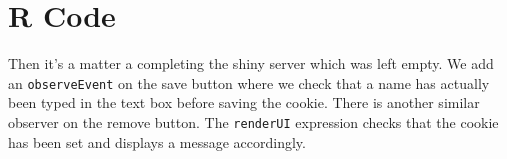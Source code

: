 \documentclass[
]{krantz}
\makeatletter
\newenvironment{Shaded}{\begin{snugshade}}{\end{snugshade}}
\newcommand{\AttributeTok}[1]{\textcolor[rgb]{0.61,0.61,0.61}{#1}}
\newcommand{\CommentTok}[1]{\textcolor[rgb]{0.37,0.37,0.37}{\textit{#1}}}
\newcommand{\KeywordTok}[1]{\textcolor[rgb]{0.27,0.27,0.27}{\textbf{#1}}}
\newcommand{\NormalTok}[1]{#1}
\newcommand{\OperatorTok}[1]{\textcolor[rgb]{0.43,0.43,0.43}{\textbf{#1}}}
\newcommand{\StringTok}[1]{\textcolor[rgb]{0.5,0.5,0.5}{#1}}
\newenvironment{kframe}{%
\medskip{}
\setlength{\fboxsep}{.8em}
 \def\at@end@of@kframe{}%
 \ifinner\ifhmode%
  \def\at@end@of@kframe{\end{minipage}}%
  \begin{minipage}{\columnwidth}%
 \fi\fi%
 \def\FrameCommand##1{\hskip\@totalleftmargin \hskip-\fboxsep
 \colorbox{shadecolor}{##1}\hskip-\fboxsep
     \hskip-\linewidth \hskip-\@totalleftmargin \hskip\columnwidth}%
 \MakeFramed {\advance\hsize-\width
   \@totalleftmargin\z@ \linewidth\hsize
   \@setminipage}}%
 {\par\unskip\endMakeFramed%
 \at@end@of@kframe}
\renewenvironment{Shaded}{\begin{kframe}}{\end{kframe}}
\makeatother
\begin{document}
\begin{Shaded}
\end{Shaded}

\hypertarget{shiny-cookies-r-code}{%
\section{R Code}\label{shiny-cookies-r-code}}

Then it's a matter a completing the shiny server which was left empty. We add an \texttt{observeEvent} on the save button where we check that a name has actually been typed in the text box before saving the cookie. There is another similar observer on the remove button. The \texttt{renderUI} expression checks that the cookie has been set and displays a message accordingly.
\end{document}
